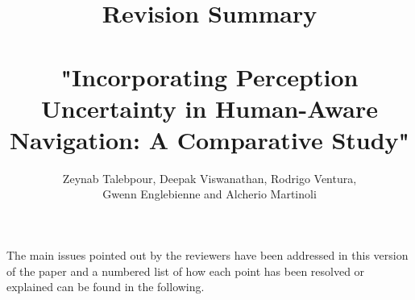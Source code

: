 \documentclass[a4paper]{article}
\begin{document}
\title{ \textbf{Revision Summary} \\ \\
"Incorporating Perception Uncertainty in Human-Aware Navigation: A Comparative Study"}
\author{Zeynab Talebpour, Deepak Viswanathan, Rodrigo Ventura,\\ Gwenn Englebienne and Alcherio Martinoli}


The main issues pointed out by the reviewers have been addressed in this version of the paper and a numbered list of how each point has been resolved or explained can be found in the following.






\end{document}
